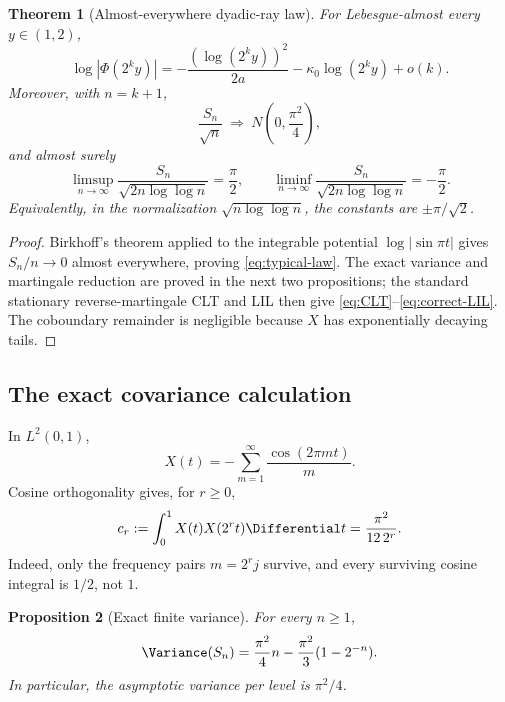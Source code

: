 \documentclass[11pt]{article}
\newtheorem{theorem}{Theorem}[section]
\newtheorem{proposition}[theorem]{Proposition}
\theoremstyle{definition}
\theoremstyle{remark}
\begin{document}
\begin{theorem}[Almost-everywhere dyadic-ray law]
\label{thm:typical}
For Lebesgue-almost every \(y\in(1,2)\),
\begin{equation}
 \log|\Phi(2^ky)|
 =-\frac{(\log(2^ky))^2}{2a}
 -\kappa_0\log(2^ky)+o(k).
 \label{eq:typical-law}
\end{equation}
Moreover, with \(n=k+1\),
\begin{equation}
 \frac{S_n}{\sqrt n}\ \Longrightarrow\
 N\!\left(0,\frac{\pi^2}{4}\right),
 \label{eq:CLT}
\end{equation}
and almost surely
\begin{equation}
 \limsup_{n\to\infty}\frac{S_n}{\sqrt{2n\log\log n}}=\frac\pi2,
 \qquad
 \liminf_{n\to\infty}\frac{S_n}{\sqrt{2n\log\log n}}=-\frac\pi2.
 \label{eq:correct-LIL}
\end{equation}
Equivalently, in the normalization \(\sqrt{n\log\log n}\), the constants are
\(\pm\pi/\sqrt2\).
\end{theorem}

\begin{proof}
Birkhoff's theorem applied to the integrable potential
\(\log|\sin\pi t|\) gives \(S_n/n\to0\) almost everywhere, proving
\eqref{eq:typical-law}.  The exact variance and martingale reduction are proved
in the next two propositions; the standard stationary reverse-martingale CLT
and LIL\cite{hallheyde} then give \eqref{eq:CLT}--\eqref{eq:correct-LIL}.  The coboundary
remainder is negligible because \(X\) has exponentially decaying tails.
\end{proof}

\subsection{The exact covariance calculation}

In \(L^2(0,1)\),
\begin{equation}
 X(t)=-\sum_{m=1}^{\infty}\frac{\cos(2\pi mt)}{m}.
 \label{eq:Clausen}
\end{equation}
Cosine orthogonality gives, for \(r\ge0\),
\begin{equation}
 c_r:=\int_0^1X(t)X(2^rt)\Differential t
 =\frac{\pi^2}{12\,2^r}.
 \label{eq:covariance}
\end{equation}
Indeed, only the frequency pairs \(m=2^rj\) survive, and every surviving
cosine integral is \(1/2\), not \(1\).

\begin{proposition}[Exact finite variance]
\label{prop:variance}
For every \(n\ge1\),
\begin{equation}
 \Variance(S_n)
 =\frac{\pi^2}{4}n-\frac{\pi^2}{3}(1-2^{-n}).
 \label{eq:exact-variance}
\end{equation}
In particular, the asymptotic variance per level is \(\pi^2/4\).
\end{proposition}
\end{document}
